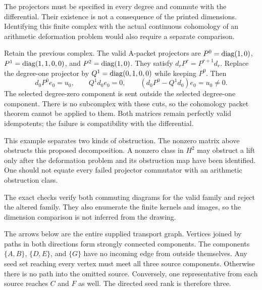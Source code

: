 The projectors must be specified in every degree and commute with the differential. Their existence is not a consequence of the printed dimensions. Identifying this finite complex with the actual continuous cohomology of an arithmetic deformation problem would also require a separate comparison.

Retain the previous complex. The valid A-packet projectors are $P^0=\operatorname{diag}(1,0)$, $P^1=\operatorname{diag}(1,1,0,0)$, and $P^2=\operatorname{diag}(1,0)$. They satisfy $d_rP^r=P^{r+1}d_r$.
Replace the degree-one projector by $Q^1=\operatorname{diag}(0,1,0,0)$ while keeping $P^0$. Then
\[
d_0P^0e_0=u_0,
\qquad Q^1d_0e_0=0,
\qquad(d_0P^0-Q^1d_0)e_0=u_0\ne0.
\]
The selected degree-zero component is sent outside the selected degree-one component. There is no subcomplex with these cuts, so the cohomology packet theorem cannot be applied to them. Both matrices remain perfectly valid idempotents; the failure is compatibility with the differential.

This example separates two kinds of obstruction. The nonzero matrix above obstructs this proposed decomposition. A nonzero class in $H^2$ may obstruct a lift only after the deformation problem and its obstruction map have been identified. One should not equate every failed projector commutator with an arithmetic obstruction class.

The exact checks verify both commuting diagrams for the valid family and reject the altered family. They also enumerate the finite kernels and images, so the dimension comparison is not inferred from the drawing.

The arrows below are the entire supplied transport graph. Vertices joined by paths in both directions form strongly connected components. The components $\{A,B\}$, $\{D,E\}$, and $\{G\}$ have no incoming edge from outside themselves.
Any seed set reaching every vertex must meet all three source components. Otherwise there is no path into the omitted source. Conversely, one representative from each source reaches $C$ and $F$ as well. The directed seed rank is therefore three.

